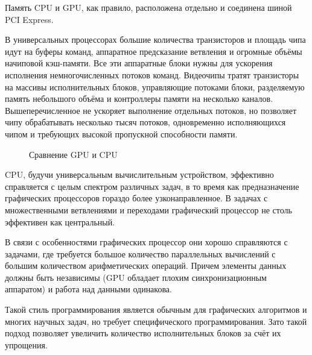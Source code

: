 \documentclass[a4paper,14pt,russian]{extreport}
\begin{document}
\par Память CPU и GPU, как правило, расположена отдельно и соединена шиной PCI Express. 
\par В универсальных процессорах большие количества транзисторов и площадь чипа идут на буферы команд, аппаратное предсказание ветвления и огромные объёмы начиповой кэш-памяти. Все эти аппаратные блоки нужны для ускорения исполнения немногочисленных потоков команд. Видеочипы тратят транзисторы на массивы исполнительных блоков, управляющие потоками блоки, разделяемую память небольшого объёма и контроллеры памяти на несколько каналов. Вышеперечисленное не ускоряет выполнение отдельных потоков, но позволяет чипу обрабатывать несколько тысяч потоков, одновременно исполняющихся чипом и требующих высокой пропускной способности памяти. \cite{poletaev}
\par
  \begin{figure}[h]
  \caption{Сравнение GPU и CPU}
  \label{ris:compare}
  \end{figure}
\par CPU, будучи универсальным вычислительным устройством, эффективно справляется с целым спектром различных задач, в то время как предназначение графических процессоров гораздо более узконаправленное. В задачах с множественными ветвлениями и переходами графический процессор не столь эффективен как центральный.
\par В связи с особенностями графических процессор они хорошо справляются с задачами, где требуется большое количество параллельных вычислений с большим количеством арифметических операций. Причем элементы данных должны быть независимы (GPU обладает плохим синхронизационным аппаратом) и работа над данными одинакова. 
\par Такой стиль программирования является обычным для графических алгоритмов и многих научных задач, но требует специфического программирования. Зато такой подход позволяет увеличить количество исполнительных блоков за счёт их упрощения.
\end{document}
